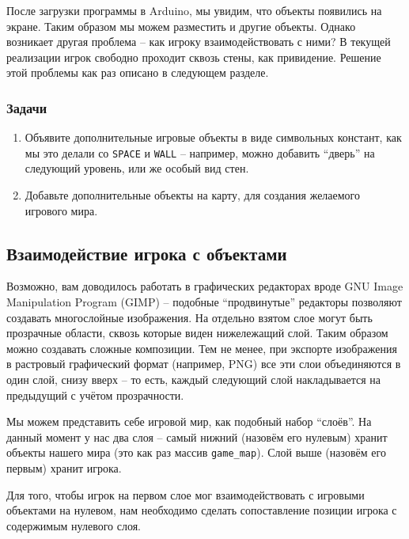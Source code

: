 \documentclass[../sparc.tex]{subfiles}
\begin{document}
После загрузки программы в Arduino, мы увидим, что объекты появились на экране.
Таким образом мы можем разместить и другие объекты.  Однако возникает другая
проблема -- как игроку взаимодействовать с ними?  В текущей реализации игрок
свободно проходит сквозь стены, как привидение.  Решение этой проблемы как раз
описано в следующем разделе.

\subsubsection{Задачи}
\begin{enumerate}
\item Объявите дополнительные игровые объекты в виде символьных констант, как мы
  это делали со \texttt{SPACE} и \texttt{WALL} -- например, можно добавить
  ``дверь'' на следующий уровень, или же особый вид стен.
\item Добавьте дополнительные объекты на карту, для создания желаемого игрового
  мира.
\end{enumerate}

\subsection{Взаимодействие игрока с объектами}

Возможно, вам доводилось работать в графических редакторах вроде GNU Image
Manipulation Program (GIMP) -- подобные ``продвинутые'' редакторы позволяют
создавать многослойные изображения.  На отдельно взятом слое могут быть
прозрачные области, сквозь которые виден нижележащий слой.  Таким образом можно
создавать сложные композиции.  Тем не менее, при экспорте изображения в
растровый графический формат (например, PNG) все эти слои объединяются в один
слой, снизу вверх -- то есть, каждый следующий слой накладывается на предыдущий
с учётом прозрачности.

Мы можем представить себе игровой мир, как подобный набор ``слоёв''.  На данный
момент у нас два слоя -- самый нижний (назовём его нулевым) хранит объекты
нашего мира (это как раз массив \texttt{game\_map}).  Слой выше (назовём его
первым) хранит игрока.

Для того, чтобы игрок на первом слое мог взаимодействовать с игровыми объектами
на нулевом, нам необходимо сделать сопоставление позиции игрока с содержимым
нулевого слоя.
\end{document}
